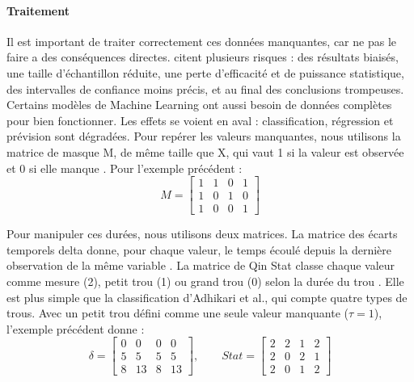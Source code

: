 
\paragraph{Traitement}
Il est important de traiter correctement ces données manquantes, car ne pas le faire a des conséquences directes. 
\cite{Adhikari_2023} citent plusieurs risques : des résultats biaisés, une taille d’échantillon réduite, une perte d’efficacité et de puissance statistique, des intervalles de confiance moins précis, et au final des conclusions trompeuses.
Certains modèles de Machine Learning ont aussi besoin de données complètes pour bien fonctionner. 
Les effets se voient en aval : classification, régression et prévision sont dégradées. %
Pour repérer les valeurs manquantes, nous utilisons la matrice de masque \gls{M}, de même taille que \gls{X}, qui vaut 1 si la valeur est observée et 0 si elle manque \cite{Fang_2020}. Pour l'exemple précédent :
\begin{equation}
M = \begin{bmatrix}
1 & 1 & 0 & 1 \\
1 & 0 & 1 & 0 \\
1 & 0 & 0 & 1
\end{bmatrix}
\end{equation}

Pour manipuler ces durées, nous utilisons deux matrices. La matrice des écarts temporels \gls{delta} donne, pour chaque valeur, le temps écoulé depuis la dernière observation de la même variable \cite{Fang_2020}. La matrice de Qin \gls{Stat} classe chaque valeur comme mesure (2), petit trou (1) ou grand trou (0) selon la durée du trou \cite{Qin_2007}. Elle est plus simple que la classification d'Adhikari et al., qui compte quatre types de trous. Avec un petit trou défini comme une seule valeur manquante ($\tau = 1$), l'exemple précédent donne :
\begin{equation}
\delta = \begin{bmatrix}
0 & 0 & 0 & 0 \\
5 & 5 & 5 & 5 \\
8 & 13 & 8 & 13
\end{bmatrix},
\qquad
\mathit{Stat} = \begin{bmatrix}
2 & 2 & 1 & 2 \\
2 & 0 & 2 & 1 \\
2 & 0 & 1 & 2
\end{bmatrix}
\end{equation}

